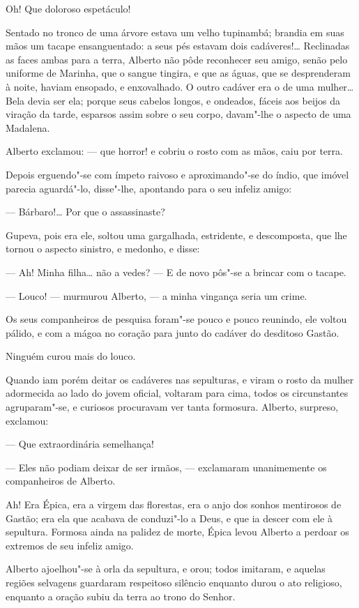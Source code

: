 Oh! Que doloroso espetáculo!

Sentado no tronco de uma árvore estava um velho tupinambá; brandia em
suas mãos um tacape ensanguentado: a seus pés estavam dois cadáveres!\ldots{}
Reclinadas as faces ambas para a terra, Alberto não pôde reconhecer seu
amigo, senão pelo uniforme de Marinha, que o sangue tingira, e que as
águas, que se desprenderam à noite, haviam ensopado, e enxovalhado. O
outro cadáver era o de uma mulher\ldots{} Bela devia ser ela; porque seus
cabelos longos, e ondeados, fáceis aos beijos da viração da tarde,
esparsos assim sobre o seu corpo, davam"-lhe o aspecto de uma Madalena.

Alberto exclamou: --- que horror! e cobriu o rosto com as mãos, caiu por
terra.

Depois erguendo"-se com ímpeto raivoso e aproximando"-se do índio, que
imóvel parecia aguardá"-lo, disse"-lhe, apontando para o seu infeliz
amigo:

--- Bárbaro!\ldots{} Por que o assassinaste?

Gupeva, pois era ele, soltou uma gargalhada, estridente, e descomposta,
que lhe tornou o aspecto sinistro, e medonho, e disse:

--- Ah! Minha filha\ldots{} não a vedes? --- E de novo pôs"-se a brincar com o
tacape.

--- Louco! --- murmurou Alberto, --- a minha vingança seria um crime.

Os seus companheiros de pesquisa foram"-se pouco e pouco reunindo, ele
voltou pálido, e com a mágoa no coração para junto do cadáver do
desditoso Gastão.

Ninguém curou mais do louco.

Quando iam porém deitar os cadáveres nas sepulturas, e viram o rosto da
mulher adormecida ao lado do jovem oficial, voltaram para cima, todos os
circunstantes agruparam"-se, e curiosos procuravam ver tanta formosura.
Alberto, surpreso, exclamou:

--- Que extraordinária semelhança!

--- Eles não podiam deixar de ser irmãos, --- exclamaram unanimemente os
companheiros de Alberto.

Ah! Era Épica, era a virgem das florestas, era o anjo dos sonhos
mentirosos de Gastão; era ela que acabava de conduzi"-lo a Deus, e que ia
descer com ele à sepultura. Formosa ainda na palidez de morte, Épica
levou Alberto a perdoar os extremos de seu infeliz amigo.

Alberto ajoelhou"-se à orla da sepultura, e orou; todos imitaram, e
aquelas regiões selvagens guardaram respeitoso silêncio enquanto durou o
ato religioso, enquanto a oração subiu da terra ao trono do Senhor.

